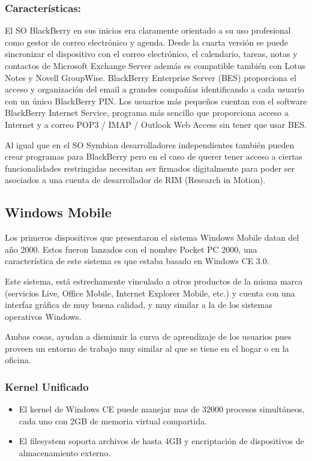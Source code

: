 \subsubsection*{Características:}
El SO BlackBerry en sus inicios era claramente orientado a su uso profesional como gestor de correo electrónico y agenda. Desde la cuarta versión se puede sincronizar el 
dispositivo con el correo electrónico, el calendario, tareas, notas y contactos de Microsoft Exchange Server además es compatible también con Lotus Notes y Novell GroupWise.
BlackBerry Enterprise Server (BES) proporciona el acceso y organización del email a grandes compañías identificando a cada usuario con un único BlackBerry PIN. Los usuarios más 
pequeños cuentan con el software BlackBerry Internet Service, programa más sencillo que proporciona acceso a Internet y a correo POP3 / IMAP / Outlook Web Access sin tener que 
usar BES.

Al igual que en el SO Symbian desarrolladores independientes también pueden crear programas para BlackBerry pero en el caso de querer tener acceso a ciertas funcionalidades 
restringidas necesitan ser firmados digitalmente para poder ser asociados a una cuenta de desarrollador de RIM (Research in Motion).


\subsection*{Windows Mobile}
Los primeros dispositivos que presentaron el sistema Windows Mobile datan del año 2000. Estos fueron lanzados con el nombre Pocket PC 2000, una característica de este sistema es 
que estaba basado en Windows CE 3.0.

Este sistema, está estrechamente vinculado a otros productos de la misma marca (servicios Live, Office Mobile, Internet Explorer Mobile, etc.) y cuenta con una interfaz gráfica 
de muy buena calidad, y muy similar a la de los sistemas operativos Windows.
 
Ambas cosas, ayudan a disminuir la curva de aprendizaje de los usuarios pues proveen un entorno de trabajo muy similar al que se tiene en el hogar o en la oficina.

\subsubsection*{Kernel Unificado}
\begin{itemize}
	\item El kernel de Windows CE puede manejar mas de 32000 procesos simultáneos, cada uno con 2GB de memoria virtual compartida.
	\item El filesystem soporta archivos de hasta 4GB y encriptación de dispositivos de almacenamiento externo.
\end{itemize}

